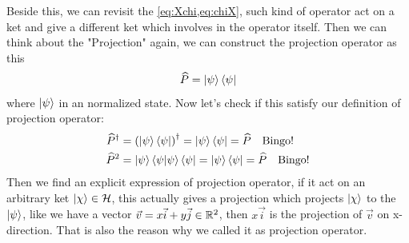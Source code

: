 Beside this, we can revisit the \cref{eq:Xchi,eq:chiX}, such kind of operator act on a ket and give a different ket which involves in the operator itself. Then we can think about the "Projection" again, we can construct the projection operator as this 
\begin{eqnarray}
    \widehat{P} = \ket{\psi} \bra{\psi}
\end{eqnarray}
where $\ket{\psi}$ in an normalized state. Now let's check if this satisfy our definition of projection operator: 
\begin{align*}
    \widehat{P}^ \dag &= \left(\ket{\psi} \bra{\psi}\right)^ \dag = \ket{\psi} \bra{\psi} = \widehat{P} \quad \text{Bingo!}\\
    \widehat{P}^2 &= \ket{\psi} \braket{\psi|\psi} \bra{\psi} = \ket{\psi} \bra{\psi} = \widehat{P} \quad \text{Bingo!} 
\end{align*}
Then we find an explicit expression of projection operator, if it act on an arbitrary ket $\ket{\chi} \in \mathcal{H}$, this actually gives a projection which projects $\ket{\chi}$ to the $\ket{\psi}$, like we have a vector $\vec{v} = x \vec{i} + y \vec{j} \in \mathbb{R}^2$, then $x\vec{i} $ is the projection of $\vec{v}$ on x-direction.
That is also the reason why we called it as projection operator.

